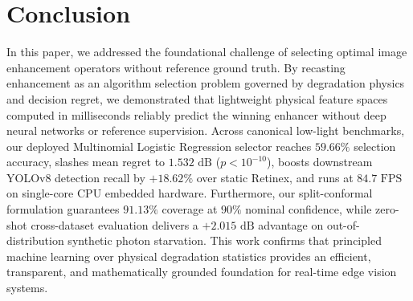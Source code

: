 \documentclass[journal]{IEEEtran}
\begin{document}
\section{Conclusion}
In this paper, we addressed the foundational challenge of selecting optimal image enhancement operators without reference ground truth. By recasting enhancement as an algorithm selection problem governed by degradation physics and decision regret, we demonstrated that lightweight physical feature spaces computed in milliseconds reliably predict the winning enhancer without deep neural networks or reference supervision. Across canonical low-light benchmarks, our deployed Multinomial Logistic Regression selector reaches $59.66\%$ selection accuracy, slashes mean regret to $1.532\text{ dB}$ ($p < 10^{-10}$), boosts downstream YOLOv8 detection recall by $+18.62\%$ over static Retinex, and runs at $84.7\text{ FPS}$ on single-core CPU embedded hardware. Furthermore, our split-conformal formulation guarantees $91.13\%$ coverage at $90\%$ nominal confidence, while zero-shot cross-dataset evaluation delivers a $+2.015\text{ dB}$ advantage on out-of-distribution synthetic photon starvation. This work confirms that principled machine learning over physical degradation statistics provides an efficient, transparent, and mathematically grounded foundation for real-time edge vision systems.
\end{document}
